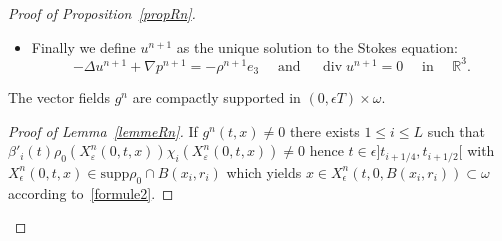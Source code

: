 \documentclass[AHL,Unicode,longabstracts,published]{cedram}
\newcommand{\supp}{\mathrm{supp} }
\newcommand{\aux}{\mathrm{aux}}
\newcommand{\R}{\mathbb{R}}
\renewcommand{\leq}{\leqslant}
\renewcommand{\geq}{\geqslant}
\renewcommand{\div}{\operatorname{div}}
\newcommand{\eps}{\epsilon}
\begin{document}
\begin{proof}[Proof of Proposition~\ref{propRn}]
\begin{itemize}
\begin{align*}
\end{align*}
with $\beta_i(t) :=\beta\left(8(L+1)(t-t_i) \right) $ with $\beta$ a cutoff function such that $\beta=1 $ for $t\leq 1/2$ and $\beta=0$ for $t\geq 1$. We observe that $\rho^{n+1}$ satisfies weakly
\begin{equation}\label{n-den}
\begin{split}
\partial_t \rho^{n+1}+ \div \left((u^\eps_\aux+u^n)\rho^{n+1}\right) &=g^n \text{ on } \R^3 \\
\rho^{n+1}(0,\cdot)=\rho_0 \quad \text{ and } \quad
\rho^{n+1}(\eps T,\cdot) &=0,
\end{split}
\end{equation}
with
\[
g^n(t,x) := \underset{i=1}{\overset{L}{\sum}}\beta'_i(t) \rho_0(X^n_\varepsilon(0,t,x)) \chi_i(X^n_\varepsilon(0,t,x)).
\]
\item Finally we define $u^{n+1}$ as the unique solution to the Stokes equation:
\begin{equation}\label{n-sto}
-\Delta u^{n+1} + \nabla p^{n+1} =-\rho^{n+1}e_3 \quad \text{ and } \quad \div u^{n+1}= 0 \quad \text{ in } \quad \R^3.
\end{equation}
\end{itemize}

\begin{lemm}\label{lemmeRn}
The vector fields $g^n$ are compactly supported in $(0,\eps T)\times \omega$.
\end{lemm}
\begin{proof}[Proof of Lemma~\ref{lemmeRn}]
If $g^n(t,x)\neq 0$ there exists $1 \leq i \leq L$ such that $\beta'_i(t) \rho_0(X^n_\varepsilon(0,t,x)) \chi_i(X^n_\varepsilon(0,t,x))\neq 0$ hence $t\in \eps]t_{i+1/4},t_{i+1/2}[$ with $X_\eps^n(0,t,x)\in \supp \rho_0 \cap B(x_i, r_i)$ which yields $x \in X_\eps^n(t,0,B(x_i,r_i)) \subset \omega $ according to~\eqref{formule2}.
\end{proof}



\end{proof}
\end{document}
